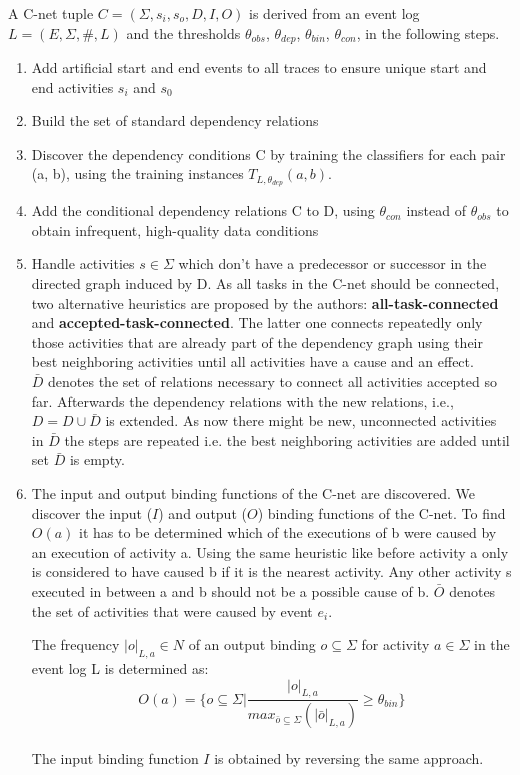 \noindent A C-net tuple $C = (\Sigma, s_i , s_o , D, I, O)$ is derived from an event log $L = (E, \Sigma, \#, L)$ and the thresholds $\theta_{obs}$, $\theta_{dep}$, $\theta_{bin}$, $\theta_{con}$, in the following steps.

\begin{enumerate}
\item Add artificial start and end events to all traces to ensure unique start and end activities $s_i$ and $s_0$
\item Build the set of standard dependency relations
\item Discover the dependency conditions C by training the classifiers for each pair (a, b), using the training instances $T_{L,\theta_{dep}} (a, b)$.
\item Add the conditional dependency relations C to D, using $\theta_{con}$ instead of $\theta_{obs}$ to
obtain infrequent, high-quality data conditions
\item Handle activities $s \in \Sigma$ which don't have a predecessor or successor in the directed
graph induced by D. As all tasks in the C-net should be connected, two alternative heuristics are proposed by the authors: \textbf{all-task-connected} and \textbf{accepted-task-connected}. The latter one connects repeatedly only those activities that are already part of the dependency graph using their best neighboring activities until all activities have a cause and an effect.\\
$\bar{D}$ denotes the set of relations necessary to connect all activities accepted so far. Afterwards the dependency relations with the new relations, i.e., $D = D \cup \bar{D}$ is extended. As now there might be new, unconnected activities in $\bar{D}$ the steps are repeated i.e. the best neighboring activities are added until set $\bar{D}$ is empty.
\item The input and output binding functions of the C-net are discovered. We discover the input ($I$) and output ($O$) binding functions of the C-net. To find $O(a)$ it has to be determined which of the executions of b were caused by an execution of activity a. Using the same heuristic like before activity a only is considered to have caused b if it is the nearest activity. Any other activity s executed in between a and b should not be a possible cause of b. $\bar{O}$ denotes the set of activities that were caused by event $e_i$.

The frequency $|o|_{L,a} \in N$ of an output binding $o \subseteq \Sigma$ for activity $a \in \Sigma$
in the event log L is determined as:
\[O(a) = \{{o \subseteq \Sigma | \frac{|o|_{L,a}}{max_{\bar{o}\subseteq \Sigma}(|\bar{o}|_{L,a})}\geq \theta_{bin}}\}\]\\
The input binding function $I$ is obtained by reversing the same approach.\protect\cite{Mannhardt17}
\end{enumerate}


























